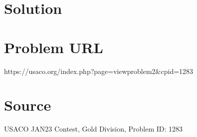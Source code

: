 \documentclass[12pt]{article}
\begin{document}
\section*{Solution}


\section*{Problem URL}
https://usaco.org/index.php?page=viewproblem2&cpid=1283

\section*{Source}
USACO JAN23 Contest, Gold Division, Problem ID: 1283
\end{document}
